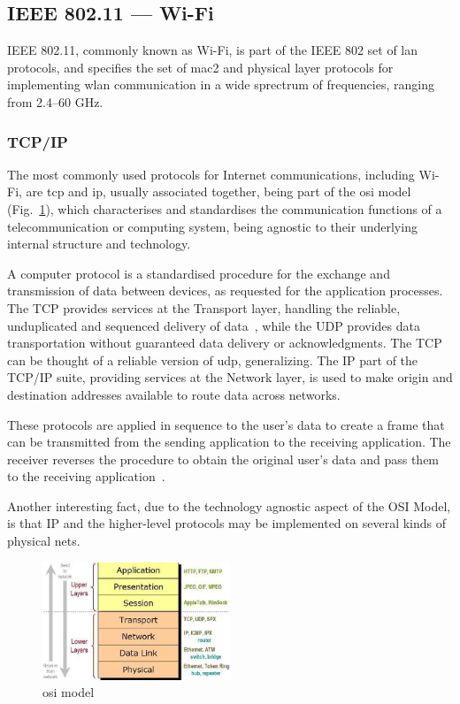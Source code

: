\subsection{IEEE 802.11 --- Wi-Fi}%
\label{sec:wifi}
IEEE 802.11, commonly known as Wi-Fi, is part of the IEEE 802 set of \gls{lan} protocols, and specifies the set of \gls{mac2} and
physical layer protocols for implementing \gls{wlan}
communication in a wide sprectrum of frequencies, ranging from 2.4--60 GHz.

\subsubsection{TCP/IP}%
\label{sec:tcpip}
The most commonly used protocols for Internet communications, including Wi-Fi,
are \gls{tcp} and \gls{ip}, usually associated together, being part of the \gls{osi} model
(Fig.~\ref{fig:osi-model}), which characterises and standardises the
communication functions of a telecommunication or computing system, being
agnostic to their underlying internal structure and technology.

A computer protocol is a standardised procedure for the exchange and
transmission of data between devices, as requested for the application processes.
The TCP provides services at the Transport layer, handling the reliable, unduplicated
and sequenced delivery of data~\cite{carne2004professional}, while the UDP provides data transportation
without guaranteed data delivery or acknowledgments. The TCP can be thought of
a reliable version of \gls{udp}, generalizing. The IP part of the TCP/IP suite, providing
services at the Network layer, is used to make origin and destination addresses
available to route data across networks.

These protocols are applied in sequence to the user's data to create a frame
that can be transmitted from the sending application to the receiving
application.
The receiver reverses the procedure to obtain the original user’s data and pass
them to the receiving application~\cite{carne2004professional}.

Another interesting fact, due to the technology agnostic aspect of the OSI
Model, is that IP and the higher-level protocols may be implemented on several
kinds of physical nets.
\begin{figure}[!hbt]
\centering
    \includegraphics[width=0.5\textwidth]{./img/osi-model.png}
  \caption{\gls{osi} model}%
\label{fig:osi-model}
\end{figure}

